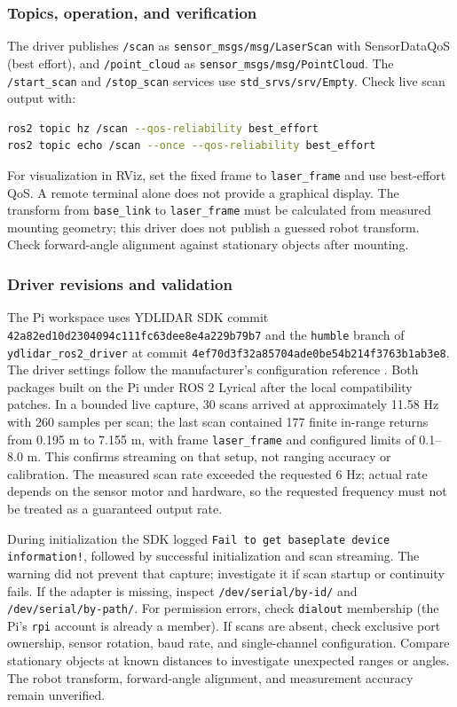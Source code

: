 \subsubsection{Topics, operation, and verification}
The driver publishes \texttt{/scan} as \texttt{sensor\_msgs/msg/LaserScan} with SensorDataQoS (best effort), and \texttt{/point\_cloud} as \texttt{sensor\_msgs/msg/PointCloud}. The \texttt{/start\_scan} and \texttt{/stop\_scan} services use \texttt{std\_srvs/srv/Empty}. Check live scan output with:
\begin{lstlisting}[language=bash]
ros2 topic hz /scan --qos-reliability best_effort
ros2 topic echo /scan --once --qos-reliability best_effort
\end{lstlisting}
For visualization in RViz, set the fixed frame to \texttt{laser\_frame} and use best-effort QoS. A remote terminal alone does not provide a graphical display. The transform from \texttt{base\_link} to \texttt{laser\_frame} must be calculated from measured mounting geometry; this driver does not publish a guessed robot transform. Check forward-angle alignment against stationary objects after mounting.

\subsubsection{Driver revisions and validation}
The Pi workspace uses YDLIDAR SDK commit \texttt{42a82ed10d2304094c111fc63dee8e4a229b79b7} and the \texttt{humble} branch of \texttt{ydlidar\_ros2\_driver} at commit \texttt{4ef70d3f32a85704ade0be54b214f3763b1ab3e8}. The driver settings follow the manufacturer's configuration reference \cite{ydlidar_config}. Both packages built on the Pi under ROS 2 Lyrical after the local compatibility patches. In a bounded live capture, 30 scans arrived at approximately 11.58 Hz with 260 samples per scan; the last scan contained 177 finite in-range returns from 0.195 m to 7.155 m, with frame \texttt{laser\_frame} and configured limits of 0.1--8.0 m. This confirms streaming on that setup, not ranging accuracy or calibration. The measured scan rate exceeded the requested 6 Hz; actual rate depends on the sensor motor and hardware, so the requested frequency must not be treated as a guaranteed output rate.

During initialization the SDK logged \texttt{Fail to get baseplate device information!}, followed by successful initialization and scan streaming. The warning did not prevent that capture; investigate it if scan startup or continuity fails. If the adapter is missing, inspect \texttt{/dev/serial/by-id/} and \texttt{/dev/serial/by-path/}. For permission errors, check \texttt{dialout} membership (the Pi's \texttt{rpi} account is already a member). If scans are absent, check exclusive port ownership, sensor rotation, baud rate, and single-channel configuration. Compare stationary objects at known distances to investigate unexpected ranges or angles. The robot transform, forward-angle alignment, and measurement accuracy remain unverified.

